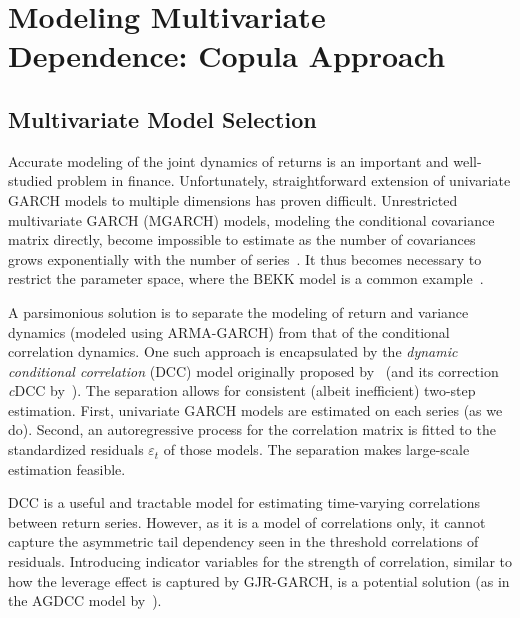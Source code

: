 
\section{Modeling Multivariate Dependence: Copula Approach} %
\label{sec:modeling_multivariate_dependence_copula_approach}

\subsection{Multivariate Model Selection} %
\label{sub:multivariate_model_selection}

Accurate modeling of the joint dynamics of returns is an important and well-studied problem in finance. Unfortunately, straightforward extension of univariate GARCH models to multiple dimensions has proven difficult. Unrestricted multivariate GARCH (MGARCH) models, modeling the conditional covariance matrix directly, become impossible to estimate as the number of covariances grows exponentially with the number of series~\autocite{WhyMGARCHSucks}. It thus becomes necessary to restrict the parameter space, where the BEKK model is a common example~\autocite{BEKKModel}.

A parsimonious solution is to separate the modeling of return and variance dynamics (modeled using ARMA-GARCH) from that of the conditional correlation dynamics. One such approach is encapsulated by the \emph{dynamic conditional correlation} (DCC) model originally proposed by~\autocite{Engle2002} (and its correction \emph{c}DCC by~\autocite{Aielli2013}). The separation allows for consistent (albeit inefficient) two-step estimation. First, univariate GARCH models are estimated on each series (as we do). Second, an autoregressive process for the correlation matrix is fitted to the standardized residuals $\varepsilon_t$ of those models. The separation makes large-scale estimation feasible.

DCC is a useful and tractable model for estimating time-varying correlations between return series. However, as it is a model of correlations only, it cannot capture the asymmetric tail dependency seen in the threshold correlations of residuals. Introducing indicator variables for the strength of correlation, similar to how the leverage effect is captured by GJR-GARCH, is a potential solution (as in the AGDCC model by~\autocite{Cappiello2006}).

